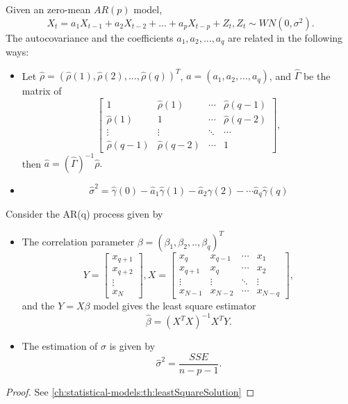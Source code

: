 \begin{theorem}
Given an zero-mean $AR(p)$ model,
$$X_t = a_1 X_{t-1} + a_2 X_{t-2} + ... + a_p X_{t-p} + Z_t, Z_t\sim WN(0,\sigma^2).$$
The autocovariance and the coefficients $a_1,a_2,...,a_q$ are related in the following ways:
\begin{itemize}
	\item Let $\hat{\rho} = (\hat{\rho}(1),\hat{\rho}(2),...,\hat{\rho}(q))^T$, $a = (a_1,a_2,...,a_q)$, and $\hat{\Gamma}$ be the matrix of
	$$\begin{bmatrix}
	1 & \hat{\rho}(1) & \cdots & \hat{\rho}(q-1)\\ 
	\hat{\rho}(1) & 1 & \cdots & \hat{\rho}(q-2)\\ 
	\vdots & \vdots & \ddots & \cdots\\ 
	\hat{\rho}(q-1) & \hat{\rho}(q-2) & \cdots & 1 
	\end{bmatrix},$$
	then $\hat{a} = (\hat{\Gamma})^{-1}\hat{\rho}.$
	\item 
	$$\hat{\sigma}^2 = \hat{\gamma}(0) - \hat{a}_1\hat{\gamma}(1) - \hat{a}_2\hat{\gamma}(2) - \cdots \hat{a}_q\hat{\gamma}(q)$$
\end{itemize}
\end{theorem}



\begin{theorem}\label{ch:time-series-analysis:th:LeastSquareParameterEstimationAR(q)}
	Consider the AR(q) process given by
	
	\begin{itemize}
		\item The correlation parameter $\beta = (\beta_1,\beta_2,..,\beta_q)^T$ 
		$$Y = \begin{bmatrix}
		x_{q+1}\\
		x_{q+2}\\
		\vdots \\
		x_N
		\end{bmatrix}, X = \begin{bmatrix}
		x_q & x_{q-1} & \cdots & x_1 \\
		x_{q+1} & x_q & \cdots & x_2\\
		\vdots & \vdots & \ddots & \vdots\\
		x_{N-1} & x_{N-2} & \cdots & x_{N-q}
		\end{bmatrix},$$
		and the $Y = X\beta $ model gives the least square estimator 
		$$\hat{\beta} = (X^TX)^{-1}X^TY.$$
		\item The estimation of $\sigma$ is given by
		$$\hat{\sigma}^2 = \frac{SSE}{n-p-1}.$$		
	\end{itemize}	
\end{theorem}
\begin{proof}
See \autoref{ch:statistical-models:th:leastSquareSolution}	
\end{proof}

